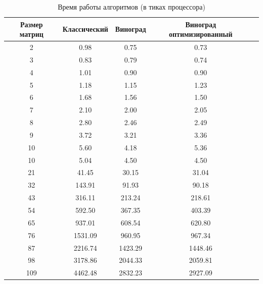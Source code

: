 \begin{table}[h]
	\begin{center}
		\begin{threeparttable}
		\captionsetup{justification=raggedright,singlelinecheck=off}
		\caption{Время работы алгоритмов (в тиках процессора)}
		\label{tbl:time_measurements}
		\begin{tabular}{|c|c|c|c|c|}
			\hline
			Размер матриц &  Классический & Виноград & Виноград оптимизированный \\
			\hline
                        2 & 0.98 & 0.75 & 0.73 \\ \hline 
                        3 & 0.83 & 0.79 & 0.74 \\ \hline 
                        4 & 1.01 & 0.90 & 0.90 \\ \hline 
                        5 & 1.18 & 1.15 & 1.23 \\ \hline 
                        6 & 1.68 & 1.56 & 1.50 \\ \hline 
                        7 & 2.10 & 2.00 & 2.05 \\ \hline 
                        8 & 2.80 & 2.46 & 2.49 \\ \hline 
                        9 & 3.72 & 3.21 & 3.36 \\ \hline 
                        10 & 5.60 & 4.18 & 5.36 \\ \hline 
                        10 & 5.04 & 4.50 & 4.50 \\ \hline 
                        21 & 41.45 & 30.15 & 31.04 \\ \hline 
                        32 & 143.91 & 91.93 & 90.18 \\ \hline 
                        43 & 316.11 & 213.24 & 218.61 \\ \hline 
                        54 & 592.50 & 367.35 & 403.39 \\ \hline 
                        65 & 937.01 & 608.54 & 620.80 \\ \hline 
                        76 & 1531.09 & 960.95 & 967.34 \\ \hline 
                        87 & 2216.74 & 1423.29 & 1448.46 \\ \hline 
                        98 & 3178.86 & 2044.33 & 2059.81 \\ \hline 
                        109 & 4462.48 & 2832.23 & 2927.09 \\ \hline 
		\end{tabular}
		\end{threeparttable}
    \end{center}
\end{table}


